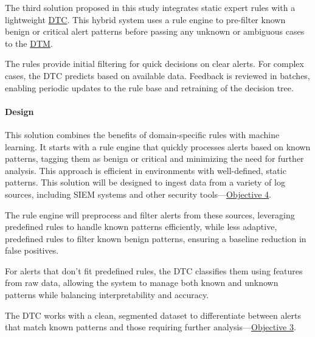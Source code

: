 The third solution proposed in this study integrates static expert rules with a lightweight \underline{\gls{DTC}}. 
This hybrid system uses a rule engine to pre-filter known benign or critical alert patterns before passing any unknown or ambiguous cases to the \underline{\gls{DTM}}. 

The rules provide initial filtering for quick decisions on clear alerts. For complex cases, the DTC predicts based on available data. 
Feedback is reviewed in batches, enabling periodic updates to the rule base and retraining of the decision tree.

\paragraph{Design}

This solution combines the benefits of domain-specific rules with machine learning.
It starts with a rule engine that quickly processes alerts based on known patterns, tagging them as benign or critical and minimizing the need for further analysis. 
This approach is efficient in environments with well-defined, static patterns. 
This solution will be designed to ingest data from a variety of log sources, including SIEM systems and other security tools—\hyperref[objective4]{Objective 4}.

The rule engine will preprocess and filter alerts from these sources, leveraging predefined rules to handle known patterns efficiently, while less adaptive, predefined rules to filter known benign patterns, ensuring a baseline reduction in false positives. 

For alerts that don't fit predefined rules, the DTC classifies them using features from raw data, allowing the system to manage both known and unknown patterns while balancing interpretability and accuracy. 

The DTC works with a clean, segmented dataset to differentiate between alerts that match known patterns and those requiring further analysis—\hyperref[objective3]{Objective 3}.

